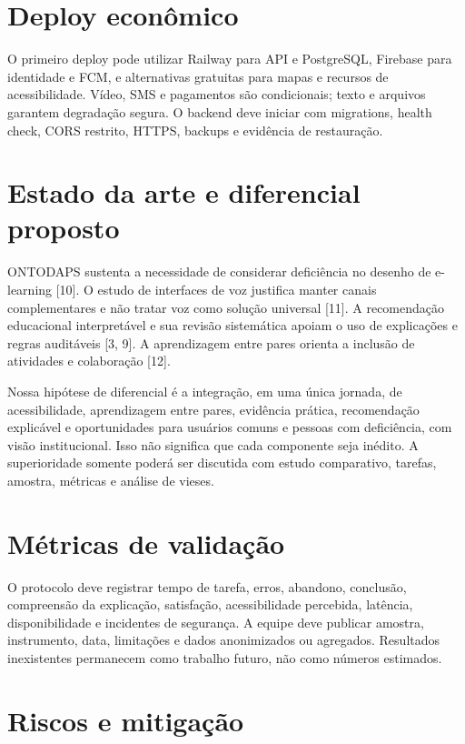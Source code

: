 \section{Deploy econômico}

O primeiro deploy pode utilizar Railway para API e PostgreSQL, Firebase para identidade e FCM, e alternativas gratuitas para mapas e recursos de acessibilidade. Vídeo, SMS e pagamentos são condicionais; texto e arquivos garantem degradação segura. O backend deve iniciar com migrations, health check, CORS restrito, HTTPS, backups e evidência de restauração.

\section{Estado da arte e diferencial proposto}

ONTODAPS sustenta a necessidade de considerar deficiência no desenho de e-learning [10]. O estudo de interfaces de voz justifica manter canais complementares e não tratar voz como solução universal [11]. A recomendação educacional interpretável e sua revisão sistemática apoiam o uso de explicações e regras auditáveis [3, 9]. A aprendizagem entre pares orienta a inclusão de atividades e colaboração [12].

Nossa hipótese de diferencial é a integração, em uma única jornada, de acessibilidade, aprendizagem entre pares, evidência prática, recomendação explicável e oportunidades para usuários comuns e pessoas com deficiência, com visão institucional. Isso não significa que cada componente seja inédito. A superioridade somente poderá ser discutida com estudo comparativo, tarefas, amostra, métricas e análise de vieses.

\section{Métricas de validação}

O protocolo deve registrar tempo de tarefa, erros, abandono, conclusão, compreensão da explicação, satisfação, acessibilidade percebida, latência, disponibilidade e incidentes de segurança. A equipe deve publicar amostra, instrumento, data, limitações e dados anonimizados ou agregados. Resultados inexistentes permanecem como trabalho futuro, não como números estimados.

\section{Riscos e mitigação}

